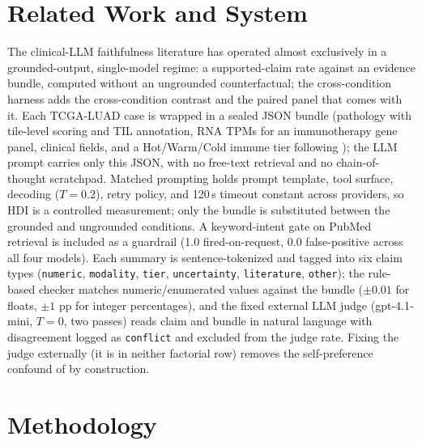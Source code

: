 \documentclass{article}
\theoremstyle{plain}
\begin{document}
\section{Related Work and System}
\label{sec:system}

The clinical-LLM faithfulness literature has operated almost exclusively in a grounded-output, single-model regime: a supported-claim rate against an evidence bundle, computed without an ungrounded counterfactual; the cross-condition harness adds the cross-condition contrast and the paired panel that comes with it. Each TCGA-LUAD case is wrapped in a sealed JSON bundle (pathology with tile-level scoring and TIL annotation, RNA TPMs for an immunotherapy gene panel, clinical fields, and a Hot/Warm/Cold immune tier following \citet{thorsson2018immune}); the LLM prompt carries only this JSON, with no free-text retrieval and no chain-of-thought scratchpad. Matched prompting holds prompt template, tool surface, decoding ($T{=}0.2$), retry policy, and 120\,s timeout constant across providers, so HDI is a controlled measurement; only the bundle is substituted between the grounded and ungrounded conditions. A keyword-intent gate on PubMed retrieval is included as a guardrail (1.0 fired-on-request, 0.0 false-positive across all four models). Each summary is sentence-tokenized and tagged into six claim types (\texttt{numeric}, \texttt{modality}, \texttt{tier}, \texttt{uncertainty}, \texttt{literature}, \texttt{other}); the rule-based checker matches numeric/enumerated values against the bundle ($\pm 0.01$ for floats, $\pm 1$ pp for integer percentages), and the fixed external LLM judge (gpt-4.1-mini, $T{=}0$, two passes) reads claim and bundle in natural language with disagreement logged as \texttt{conflict} and excluded from the judge rate. Fixing the judge externally (it is in neither factorial row) removes the self-preference confound of \citet{panickssery2024llm} by construction.

\section{Methodology}
\label{sec:methods}
\end{document}
